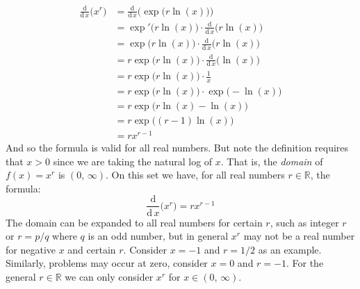 \documentclass{article}
\theoremstyle{plain}
\begin{document}
    \begin{align}
        \frac{\textrm{d}}{\textrm{d}\,x}\big(x^{r}\big)
            &=\frac{\textrm{d}}{\textrm{d}\,x}\Big(\exp\big(r\ln(x)\big)\Big)
                \tag{Definition}\\
            &=\exp'\big(r\ln(x)\big)\cdot
                \frac{\textrm{d}}{\textrm{d}\,x}\big(r\ln(x)\big)
                    \tag{Chain Rule}\\
            &=\exp\big(r\ln(x)\big)\cdot
                \frac{\textrm{d}}{\textrm{d}\,x}\big(r\ln(x)\big)
                    \tag{Derivative of $\exp$}\\
            &=r\exp\big(r\ln(x)\big)\cdot
                \frac{\textrm{d}}{\textrm{d}\,x}\big(\ln(x)\big)
                    \tag{Factor Constants}\\
            &=r\exp\big(r\ln(x)\big)\cdot\frac{1}{x}
                \tag{Derivative of $\ln$}\\
            &=r\exp\big(r\ln(x)\big)\cdot\exp\big(-\ln(x)\big)
                \tag{Definition}\\
            &=r\exp\big(r\ln(x)-\ln(x)\big)
                \tag{Exponent Rule}\\
            &=r\exp\big((r-1)\ln(x)\big)
                \tag{Simplify}\\
            &=rx^{r-1}
                \tag{Definition}
    \end{align}
    And so the formula is valid for all real numbers. But note the definition
    requires that $x>0$ since we are taking the natural log of $x$. That is,
    the \textit{domain} of $f(x)=x^{r}$ is $(0,\,\infty)$. On this set we have,
    for all real numbers $r\in\mathbb{R}$, the formula:
    \begin{equation}
        \frac{\textrm{d}}{\textrm{d}\,x}\big(x^{r}\big)=rx^{r-1}
    \end{equation}
    The domain can be expanded to all real numbers for certain $r$, such as
    integer $r$ or $r=p/q$ where $q$ is an odd number, but in general
    $x^{r}$ may not be a real number for negative $x$ and certain $r$.
    Consider $x=-1$ and $r=1/2$ as an example. Similarly, problems may occur
    at zero, consider $x=0$ and $r=-1$. For the general $r\in\mathbb{R}$ we
    can only consider $x^{r}$ for $x\in(0,\,\infty)$.
\end{document}

